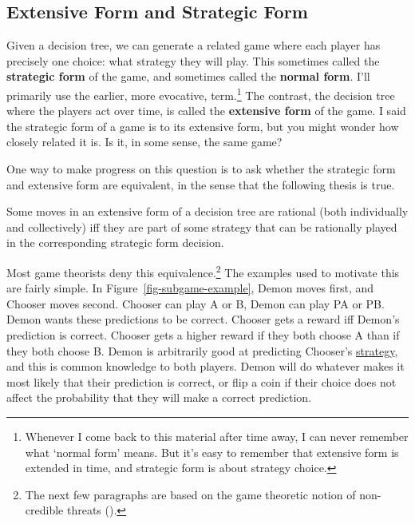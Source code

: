 \documentclass[
  12pt,
  letterpaper,
  DIV=11,
  numbers=noendperiod]{scrreprt}
\providecommand{\tightlist}{%
  \setlength{\itemsep}{0pt}\setlength{\parskip}{0pt}}\usepackage{longtable,booktabs,array}
\begin{document}
\subsection{Extensive Form and Strategic
Form}\label{sec-equivalence-intro}

Given a decision tree, we can generate a related game where each player
has precisely one choice: what strategy they will play. This sometimes
called the \textbf{strategic form} of the game, and sometimes called the
\textbf{normal form}. I'll primarily use the earlier, more evocative,
term.\footnote{Whenever I come back to this material after time away, I
  can never remember what `normal form' means. But it's easy to remember
  that extensive form is extended in time, and strategic form is about
  strategy choice.} The contrast, the decision tree where the players
act over time, is called the \textbf{extensive form} of the game. I said
the strategic form of a game is to its extensive form, but you might
wonder how closely related it is. Is it, in some sense, the same game?

One way to make progress on this question is to ask whether the
strategic form and extensive form are equivalent, in the sense that the
following thesis is true.

\begin{description}
\tightlist
\item[Strategic Form - Extensive Form Equivalence]
Some moves in an extensive form of a decision tree are rational (both
individually and collectively) iff they are part of some strategy that
can be rationally played in the corresponding strategic form decision.
\end{description}

Most game theorists deny this equivalence.\footnote{The next few
  paragraphs are based on the game theoretic notion of non-credible
  threats ().} The
examples used to motivate this are fairly simple. In
Figure~\ref{fig-subgame-example}, Demon moves first, and Chooser moves
second. Chooser can play A or B, Demon can play PA or PB. Demon wants
these predictions to be correct. Chooser gets a reward iff Demon's
prediction is correct. Chooser gets a higher reward if they both choose
A than if they both choose B. Demon is arbitrarily good at predicting
Chooser's \hyperref[sec-strategies]{strategy}, and this is common
knowledge to both players. Demon will do whatever makes it most likely
that their prediction is correct, or flip a coin if their choice does
not affect the probability that they will make a correct prediction.
\end{document}

